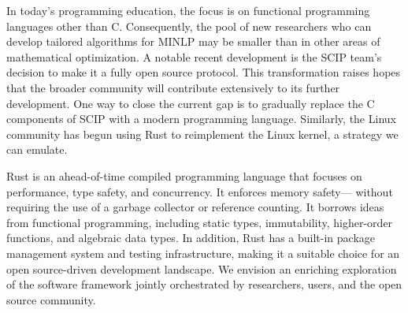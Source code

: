 In today's programming education, the focus is on functional programming languages other than C. Consequently, the pool of new researchers who can develop tailored algorithms for MINLP may be smaller than in other areas of mathematical optimization.
A notable recent development is the SCIP team's decision to make it a fully open source protocol. This transformation raises hopes that the broader community will contribute extensively to its further development. One way to close the current gap is to gradually replace the C components of SCIP with a modern programming language. Similarly, the Linux community has begun using Rust to reimplement the Linux kernel, a strategy we can emulate.


Rust is an ahead-of-time compiled programming language that focuses on performance, type safety, and concurrency. It enforces memory safety— without requiring the use of a garbage collector or reference counting. It borrows ideas from functional programming, including static types, immutability, higher-order functions, and algebraic data types.
In addition, Rust has a built-in package management system and testing infrastructure, making it a suitable choice for an open source-driven development landscape. We envision an enriching exploration of the software framework jointly orchestrated by researchers, users, and the open source community.

